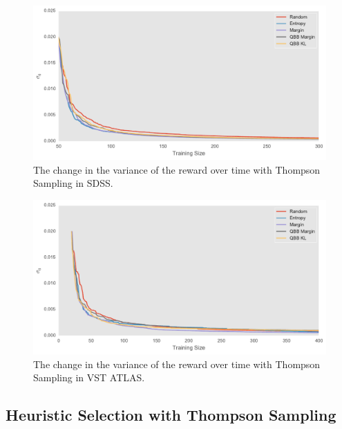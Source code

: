 \begin{figure}[tbp]
	\centering
	\includegraphics[width=\textwidth]{figures/bandit_sigma_sdss}
	\caption{The change in the variance of the reward over time with Thompson Sampling in SDSS.}
	\label{fig:bandit_sigma_sdss} 
\end{figure}

\begin{figure}[tbp]
	\centering
	\includegraphics[width=\textwidth]{figures/bandit_sigma_vst}
	\caption{The change in the variance of the reward over time with Thompson Sampling in VST ATLAS.}
	\label{fig:bandit_sigma_vst} 
\end{figure}

\subsection{Heuristic Selection with Thompson Sampling}

